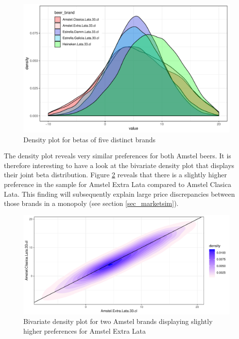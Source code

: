 \documentclass[12pt,a4paper]{article}
\begin{document}
\begin{figure}[ht]
	\centering
  \includegraphics[scale = 0.65]{figures/dens_betas_five_in_one.pdf}
	\caption{Density plot for betas of five distinct brands}
	\label{fig_dens_five}
\end{figure}

The density plot reveals very similar preferences for both Amstel beers.
It is therefore interesting to have a look at the bivariate density plot that displays their joint beta distribution.
Figure \ref{fig_dens_amstel_biv} reveals that there is a slightly higher preference in the sample for Amstel Extra Lata compared to Amstel Clasica Lata.
This finding will subsequently explain large price discrepancies between those brands in a monopoly (see section \ref{sec_marketsim}).

\begin{figure}[ht]
	\centering
  \includegraphics[scale = 0.6]{figures/amstel_bivariate_density.pdf}
	\caption{Bivariate density plot for two Amstel brands displaying slightly higher preferences for Amstel Extra Lata}
	\label{fig_dens_amstel_biv}
\end{figure}
\end{document}
